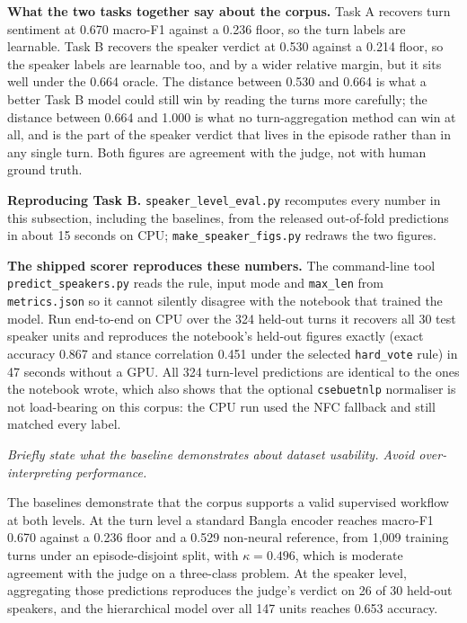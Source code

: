 \documentclass[11pt,a4paper]{article}
\begin{document}
\vspace{2pt}
\textbf{What the two tasks together say about the corpus.} Task A recovers turn sentiment at 0.670
macro-F1 against a 0.236 floor, so the turn labels are learnable. Task B recovers the speaker
verdict at 0.530 against a 0.214 floor, so the speaker labels are learnable too, and by a wider
relative margin, but it sits well under the 0.664 oracle. The distance between 0.530 and 0.664 is
what a better Task B model could still win by reading the turns more carefully; the distance
between 0.664 and 1.000 is what no turn-aggregation method can win at all, and is the part of the
speaker verdict that lives in the episode rather than in any single turn. Both figures are
agreement with the judge, not with human ground truth.

\vspace{2pt}
\textbf{Reproducing Task B.} \texttt{speaker\_level\_eval.py} recomputes every number in this
subsection, including the baselines, from the released out-of-fold predictions in about 15
seconds on CPU; \texttt{make\_speaker\_figs.py} redraws the two figures.

\textbf{The shipped scorer reproduces these numbers.} The command-line tool
\texttt{predict\_speakers.py} reads the rule, input mode and \texttt{max\_len} from
\texttt{metrics.json} so it cannot silently disagree with the notebook that trained the model.
Run end-to-end on CPU over the 324 held-out turns it recovers all 30 test speaker units and
reproduces the notebook's held-out figures exactly (exact accuracy 0.867 and stance
correlation 0.451 under the selected \texttt{hard\_vote} rule) in 47 seconds without a GPU.
All 324 turn-level predictions are identical to the ones the notebook wrote, which also shows
that the optional \texttt{csebuetnlp} normaliser is not load-bearing on this corpus: the CPU run
used the NFC fallback and still matched every label.

\emph{\small Briefly state what the baseline demonstrates about dataset usability. Avoid
over-interpreting performance.}

The baselines demonstrate that the corpus supports a valid supervised workflow at both levels. At
the turn level a standard Bangla encoder reaches macro-F1 0.670 against a 0.236 floor and a 0.529
non-neural reference, from 1{,}009 training turns under an episode-disjoint split, with
$\kappa=0.496$, which is moderate agreement with the judge on a three-class problem. At the speaker level,
aggregating those predictions reproduces the judge's verdict on 26 of 30 held-out speakers, and the
hierarchical model over all 147 units reaches 0.653 accuracy.
\end{document}

